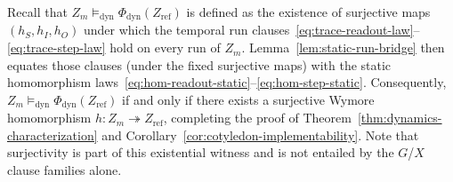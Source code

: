 Recall that $Z_m\models_{\mathrm{dyn}}\Phi_{\mathrm{dyn}}(Z_{\mathrm{ref}})$ is defined as the existence of surjective maps $(h_S,h_I,h_O)$ under which the temporal run clauses~\eqref{eq:trace-readout-law}--\eqref{eq:trace-step-law} hold on every run of $Z_m$. Lemma~\ref{lem:static-run-bridge} then equates those clauses (under the fixed surjective maps) with the static homomorphism laws~\eqref{eq:hom-readout-static}--\eqref{eq:hom-step-static}. Consequently, $Z_m\models_{\mathrm{dyn}}\Phi_{\mathrm{dyn}}(Z_{\mathrm{ref}})$ if and only if there exists a surjective Wymore homomorphism $h:Z_m\twoheadrightarrow Z_{\mathrm{ref}}$, completing the proof of Theorem~\ref{thm:dynamics-characterization} and Corollary~\ref{cor:cotyledon-implementability}. Note that surjectivity is part of this existential witness and is not entailed by the $G$/$X$ clause families alone.
